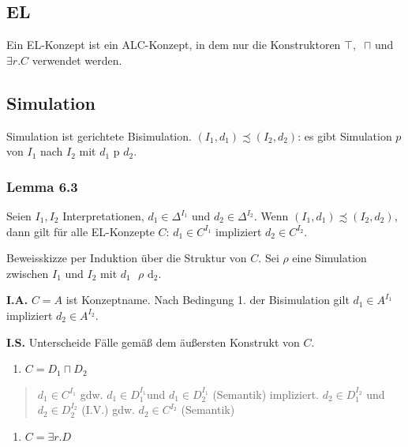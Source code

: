 
\subsection{EL}\label{el}

Ein EL-Konzept ist ein ALC-Konzept, in dem nur die Konstruktoren
$\top,\ $ $\sqcap$ und $\exists r.C$ verwendet werden.

\subsection{Simulation}\label{simulation}

Simulation ist gerichtete Bisimulation.
$\left( I_1,d_1 \right) \precsim \left( I_2,d_2 \right)$: es
gibt Simulation $p$ von $I_1$ nach $I_2$ mit
$d_1\text{\ p\ }d_2$.

\hypertarget{lemma-6.3}{\subsubsection{Lemma 6.3}\label{lemma-6.3}}

Seien $I_1,I_2$ Interpretationen, $d_1 \in \Delta^{I_1}$ und
$d_2 \in \Delta^{I_2}$. Wenn
$\left( I_1,d_1 \right) \precsim \left( I_2,d_2 \right)$, dann
gilt für alle EL-Konzepte $C$: $d_1 \in C^{I_1}$ impliziert
$d_2 \in C^{I_2}$.

Beweisskizze per Induktion über die Struktur von $C$. Sei $\rho$
eine Simulation zwischen $I_1$ und $I_2$ mit
$d_1\text{\ $\rho$}\text{\ d}_2$.

\textbf{I.A.} $C = A$ ist Konzeptname. Nach Bedingung 1. der
Bisimulation gilt $d_1 \in A^{I_1}$ impliziert
$d_2 \in A^{I_2}$.

\textbf{I.S.} Unterscheide Fälle gemäß dem äußersten Konstrukt von
$C$.

\begin{enumerate}
\def\labelenumi{\arabic{enumi}.}
\item
  $C = D_1 \sqcap D_2$
\end{enumerate}

\begin{quote}
$d_1 \in C^{I_1}$ gdw. $d_1 \in D_1^{I_1}$und
$d_1 \in D_2^{I_1}$ (Semantik) impliziert.
$d_2 \in D_1^{I_2}$ und $d_2 \in D_2^{I_2}$ (I.V.) gdw.
$d_2 \in C^{I_2}$ (Semantik)
\end{quote}

\begin{enumerate}
\def\labelenumi{\arabic{enumi}.}
\item
  $C = \exists r.D$
\end{enumerate}

